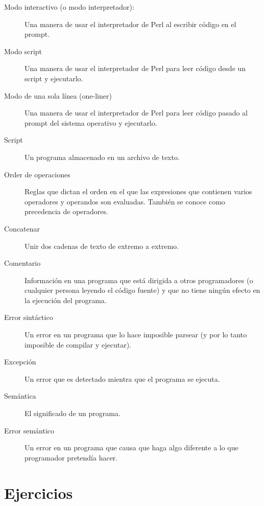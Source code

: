\begin{description}
\item[Modo interactivo (o modo interpretador):] Una manera de usar el interpretador 
de Perl al escribir código en el prompt.

\item[Modo script] Una manera de usar el interpretador 
de Perl para leer código desde un script y ejecutarlo.

\item[Modo de una sola línea (one-liner)] Una manera de usar el interpretador 
de Perl para leer código pasado al prompt del sistema operativo 
y ejecutarlo.

\item[Script] Un programa almacenado en un archivo de texto.

\item[Order de operaciones]  Reglas que dictan el orden en el que las expresiones
que contienen varios operadores y operandos son evaluadas.
También se conoce como precedencia de operadores.

\item[Concatenar]  Unir dos cadenas de texto de extremo a extremo.

\item[Comentario]  Información en una programa que está dirigida a otros programadores
(o cualquier persona leyendo el código fuente) y que no tiene ningún efecto en 
la ejecución del programa.

\item[Error sintáctico]  Un error en un programa que lo hace imposible
parsear (y por lo tanto imposible de compilar y ejecutar).

\item[Excepción]  Un error que es detectado mientra que el programa se ejecuta.

\item[Semántica]  El significado de un programa.

\item[Error semántico] Un error en un programa que causa que haga algo 
diferente a lo que programador pretendía hacer.

\end{description}


\section{Ejercicios}

